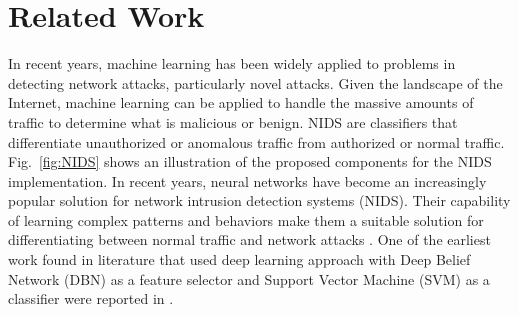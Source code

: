 \documentclass[letterpaper, 10pt, conference]{ieeeconf} %
\newcommand{\fig}[1]{Fig.~\ref{#1}}
\begin{document}
\section{Related Work} \label{sec:methods}
In recent years, machine learning has been widely applied to problems in detecting network attacks, particularly novel attacks.  Given the landscape of the Internet, machine learning can be applied to handle the massive amounts of traffic to determine what is malicious or benign. NIDS are classifiers that differentiate unauthorized or anomalous
traffic from authorized or normal traffic. \fig{fig:NIDS} shows an illustration of the proposed components for the NIDS implementation. In recent years, neural networks have become an increasingly popular solution for network intrusion detection systems (NIDS). Their capability of learning complex patterns and behaviors make them a suitable solution for differentiating between normal traffic and network attacks \cite{Yisroel2018}. One of the earliest work found in literature that used deep learning approach with Deep Belief Network (DBN) as a feature selector and Support Vector Machine (SVM) as a classifier were reported in \cite{salama2011}.
\end{document}
